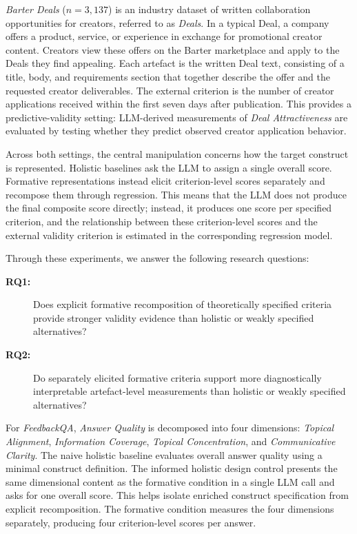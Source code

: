 \textit{Barter Deals} ($n=3{,}137$) is an industry dataset of written collaboration opportunities for creators, referred to as \textit{Deals}. In a typical Deal, a company offers a product, service, or experience in exchange for promotional creator content. Creators view these offers on the Barter marketplace and apply to the Deals they find appealing. Each artefact is the written Deal text, consisting of a title, body, and requirements section that together describe the offer and the requested creator deliverables. The external criterion is the number of creator applications received within the first seven days after publication. This provides a predictive-validity setting: LLM-derived measurements of \textit{Deal Attractiveness} are evaluated by testing whether they predict observed creator application behavior.

Across both settings, the central manipulation concerns how the target construct is represented. Holistic baselines ask the LLM to assign a single overall score. Formative representations instead elicit criterion-level scores separately and recompose them through regression. This means that the LLM does not produce the final composite score directly; instead, it produces one score per specified criterion, and the relationship between these criterion-level scores and the external validity criterion is estimated in the corresponding regression model.

Through these experiments, we answer the following research questions:

\begin{description}
\item[\textbf{RQ1:}] Does explicit formative recomposition of theoretically specified criteria provide stronger validity evidence than holistic or weakly specified alternatives?
\item[\textbf{RQ2:}] Do separately elicited formative criteria support more diagnostically interpretable artefact-level measurements than holistic or weakly specified alternatives?
\end{description}

For \textit{FeedbackQA}, \textit{Answer Quality} is decomposed into four dimensions: \textit{Topical Alignment}, \textit{Information Coverage}, \textit{Topical Concentration}, and \textit{Communicative Clarity}. The naive holistic baseline evaluates overall answer quality using a minimal construct definition. The informed holistic design control presents the same dimensional content as the formative condition in a single LLM call and asks for one overall score. This helps isolate enriched construct specification from explicit recomposition. The formative condition measures the four dimensions separately, producing four criterion-level scores per answer.

